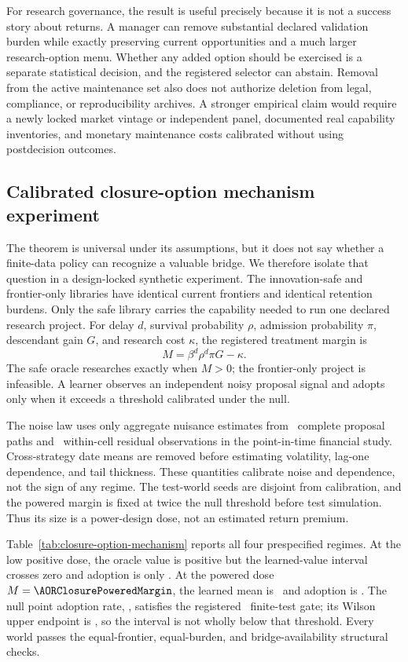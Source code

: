 For research governance, the result is useful precisely because it is not a
success story about returns. A manager can remove substantial declared
validation burden while exactly preserving current opportunities and a much
larger research-option menu. Whether any added option should be exercised is a
separate statistical decision, and the registered selector can abstain.
Removal from the active maintenance set also does not authorize deletion from
legal, compliance, or reproducibility archives. A stronger empirical claim
would require a newly locked market vintage or independent panel, documented
real capability inventories, and monetary maintenance costs calibrated without
using postdecision outcomes.

\subsection{Calibrated closure-option mechanism experiment}
\label{sec:closure-option-mechanism}

The theorem is universal under its assumptions, but it does not say whether a
finite-data policy can recognize a valuable bridge. We therefore isolate that
question in a design-locked synthetic experiment. The innovation-safe and
frontier-only libraries have identical current frontiers and identical
retention burdens. Only the safe library carries the capability needed to run
one declared research project. For delay \(d\), survival probability \(\rho\),
admission probability \(\pi\), descendant gain \(G\), and research cost
\(\kappa\), the registered treatment margin is
\[
 M=\beta^d\rho^d\pi G-\kappa.
\]
The safe oracle researches exactly when \(M>0\); the frontier-only project is
infeasible. A learner observes an independent noisy proposal signal and adopts
only when it exceeds a threshold calibrated under the null.

The noise law uses only aggregate nuisance estimates from
\AORPointInTimeCompletePaths\ complete proposal paths and
\AORPointInTimeResidualObservations\ within-cell residual observations in the
point-in-time financial study. Cross-strategy date means are removed before
estimating volatility, lag-one dependence, and tail thickness. These
quantities calibrate noise and dependence, not the sign of any regime. The
test-world seeds are disjoint from calibration, and the powered margin is
fixed at twice the null threshold before test simulation. Thus its size is a
power-design dose, not an estimated return premium.

Table~\ref{tab:closure-option-mechanism} reports all four prespecified regimes.
At the low positive dose, the oracle value is positive but the learned-value
interval crosses zero and adoption is only \AORClosureLowDoseAdoption. At the
powered dose \(M=\AORClosurePoweredMargin\), the learned mean is
\AORClosurePoweredLearnedMean\ and adoption is
\AORClosurePoweredAdoption. The null point adoption rate,
\AORClosureNullAdoption, satisfies the registered
\AORClosureNullAdoptionGate\ finite-test gate;
its Wilson upper endpoint is \AORClosureNullWilsonUpper, so the interval is
not wholly below that threshold. Every world passes the equal-frontier,
equal-burden, and bridge-availability structural checks.

